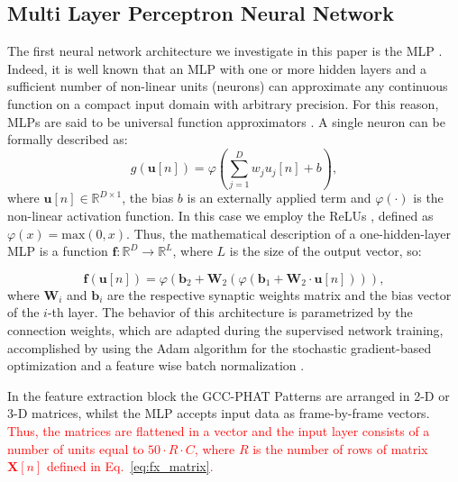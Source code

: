\documentclass[review]{elsarticle}
\let\originaleqref=\eqref
\renewcommand{\eqref}{Eq.~\originaleqref}
\begin{document}
\subsection{Multi Layer Perceptron Neural Network}
\label{sec:MLP}
The first neural network architecture we investigate in this paper is the MLP \cite{Rumelhart86-LRB}. Indeed, it is well known that an  MLP with one or more hidden layers and a sufficient number of non-linear units (neurons) can  approximate any continuous  function  on  a  compact  input  domain  with arbitrary precision. For this reason, MLPs are said to be universal function approximators \cite{hornik1989multilayer}. A single neuron can be formally described as:
\begin{equation}
g(\mathbf{u}[n])=\varphi \left(\sum _{ j=1 }^{ D }{w_j u_j[n] } + b\right),
\end{equation}
where $\mathbf{u}[n] \in \mathbb{R}^{D\times 1}$, the bias $b$ is an externally applied term and $\varphi(\cdot)$ is the non-linear activation function. In this case we employ the ReLUs \cite{nair2010rectified}, defined as $\varphi(x) = \text{max}(0,x)$.
Thus, the mathematical description of a one-hidden-layer MLP is a function $\mathbf{f}:\mathbb{R}^D \rightarrow \mathbb{R}^L$, where $L$ is the size of the output vector, so:

\begin{equation}
\mathbf{f}(\mathbf{u}[n]) = 	\varphi \left( \mathbf{b}_2 + \mathbf{W}_2 \left( \varphi \left( \mathbf{b}_1 + \mathbf{W}_2 \cdot \mathbf{u}[n]\right) \right) \right),
\end{equation}
where $\mathbf{W}_i$ and $\mathbf{b}_{i}$ are the respective synaptic weights matrix and the bias vector of the $i$-th layer.
The  behavior  of  this architecture  is  parametrized  by  the connection weights, which are adapted during the supervised network training, accomplished by using the Adam algorithm \cite{kingma2014adam} for the stochastic gradient-based optimization and a feature wise batch normalization \cite{ioffe2015batch}.

In the feature extraction block the GCC-PHAT Patterns are arranged in 2-D or 3-D matrices, whilst the MLP accepts input data as frame-by-frame vectors. \textcolor{red}{Thus, the matrices are flattened in a vector and the input layer consists of a number of units equal to $50 \cdot R\cdot C$, where $R$ is the number of rows of matrix $\mathbf{X}[n]$ defined in \eqref{eq:fx_matrix}.}
\end{document}
